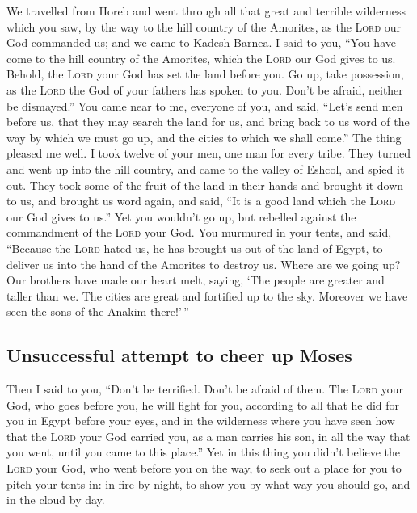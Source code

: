  We travelled from Horeb and went through all that great
and terrible wilderness which you saw, by the way to the hill country of
the Amorites, as the \textsc{Lord} our God commanded us; and we came to
Kadesh Barnea.  I said to you, ``You have come to the
hill country of the Amorites, which the \textsc{Lord} our God gives to
us.  Behold, the \textsc{Lord} your God has set the land
before you. Go up, take possession, as the \textsc{Lord} the God of your
fathers has spoken to you. Don't be afraid, neither be dismayed.''
 You came near to me, everyone of you, and said, ``Let's
send men before us, that they may search the land for us, and bring back
to us word of the way by which we must go up, and the cities to which we
shall come.''  The thing pleased me well. I took twelve
of your men, one man for every tribe.  They turned and
went up into the hill country, and came to the valley of Eshcol, and
spied it out.  They took some of the fruit of the land in
their hands and brought it down to us, and brought us word again, and
said, ``It is a good land which the \textsc{Lord} our God gives to us.''
 Yet you wouldn't go up, but rebelled against the
commandment of the \textsc{Lord} your God.  You murmured
in your tents, and said, ``Because the \textsc{Lord} hated us, he has
brought us out of the land of Egypt, to deliver us into the hand of the
Amorites to destroy us.  Where are we going up? Our
brothers have made our heart melt, saying, `The people are greater and
taller than we. The cities are great and fortified up to the sky.
Moreover we have seen the sons of the Anakim there!'\,''

\hypertarget{unsuccessful-attempt-to-cheer-up-moses}{%
\subsection{Unsuccessful attempt to cheer up
Moses}\label{unsuccessful-attempt-to-cheer-up-moses}}

 Then I said to you, ``Don't be terrified. Don't be
afraid of them.  The \textsc{Lord} your God, who goes
before you, he will fight for you, according to all that he did for you
in Egypt before your eyes,  and in the wilderness where
you have seen how that the \textsc{Lord} your God carried you, as a man
carries his son, in all the way that you went, until you came to this
place.''  Yet in this thing you didn't believe the
\textsc{Lord} your God,  who went before you on the way,
to seek out a place for you to pitch your tents in: in fire by night, to
show you by what way you should go, and in the cloud by day.

